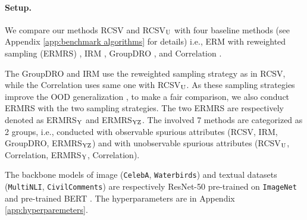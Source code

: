 \documentclass{article} %
\begin{document}
	\paragraph{Setup.} We compare our methods RCSV and RCSV$_{\rm U}$ with four baseline methods (see Appendix \ref{app:benchmark algorithms} for details) i.e., ERM with reweighted sampling (ERMRS) \citep{idrissi2021simple}, IRM \citep{arjovsky2019invariant}, GroupDRO \citep{sagawa2019distributionally}, and Correlation \citep{arpit2019predicting}. 
	\par
	The GroupDRO and IRM use the reweighted sampling strategy as in RCSV, while the Correlation uses same one with RCSV$_{\rm U}$. As these sampling strategies improve the OOD generalization \citep{idrissi2021simple}, to make a fair comparison, we also conduct ERMRS with the two sampling strategies. The two ERMRS are respectively denoted as ERMRS$_{\rm Y}$ and ERMRS$_{\rm YZ}$. The involved 7 methods are categorized as 2 groups, i.e., conducted with observable spurious attributes (RCSV, IRM, GroupDRO, ERMRS$_{\rm YZ}$) and with unobservable spurious attributes (RCSV$_{\rm U}$, Correlation, ERMRS$_{\rm Y}$, Correlation). 
	\par
	\par
	The backbone models of image (\texttt{CelebA}, \texttt{Waterbirds}) and textual datasets (\texttt{MultiNLI}, \texttt{CivilComments}) are respectively ResNet-50 \citep{he2016deep} pre-trained on \texttt{ImageNet} \citep{deng2009imagenet} and pre-trained BERT \citep{devlin2019bert}. The hyperparameters are in Appendix \ref{app:hyperparemeters}.
\end{document}
